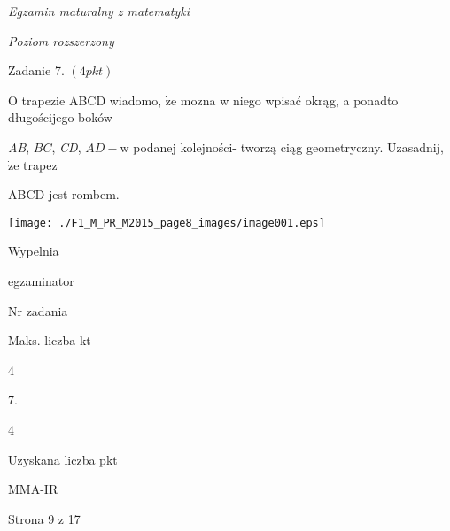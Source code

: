 \documentclass[a4paper,12pt]{article}
\begin{document}
{\it Egzamin maturalny z matematyki}

{\it Poziom rozszerzony}

Zadanie 7. $(4pkt)$

$\mathrm{O}$ trapezie ABCD wiadomo, $\dot{\mathrm{z}}\mathrm{e}$ mozna w niego wpisać okrąg, a ponadto długościjego boków

{\it AB}, $BC$, {\it CD}, $AD-\mathrm{w}$ podanej kolejności- tworzą ciąg geometryczny. Uzasadnij, $\dot{\mathrm{z}}\mathrm{e}$ trapez

ABCD jest rombem.
\begin{center}
\texttt{[image: ./F1\_M\_PR\_M2015\_page8\_images/image001.eps]}
\end{center}
Wypelnia

egzaminator

Nr zadania

Maks. liczba kt

4

7.

4

Uzyskana liczba pkt

MMA-IR

Strona 9 z 17
\end{document}
